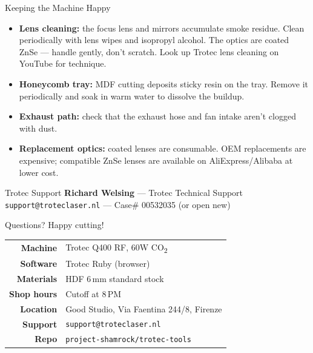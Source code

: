 \documentclass[aspectratio=169]{beamer}
\begin{document}
\begin{frame}{Keeping the Machine Happy}
\begin{itemize}
    \item \textbf{Lens cleaning:} the focus lens and mirrors accumulate smoke residue.
        Clean periodically with lens wipes and isopropyl alcohol.
        The optics are coated ZnSe --- handle gently, don't scratch.
        Look up Trotec lens cleaning on YouTube for technique.
    \item \textbf{Honeycomb tray:} MDF cutting deposits sticky resin on the tray.
        Remove it periodically and soak in warm water to dissolve the buildup.
    \item \textbf{Exhaust path:} check that the exhaust hose and fan intake
        aren't clogged with dust.
    \item \textbf{Replacement optics:} coated lenses are consumable.
        OEM replacements are expensive; compatible ZnSe lenses
        are available on AliExpress/Alibaba at lower cost.
\end{itemize}

\begin{block}{Trotec Support}
\textbf{Richard Welsing} --- Trotec Technical Support\\
\texttt{support@troteclaser.nl} --- Case\# 00532035 (or open new)
\end{block}
\end{frame}

\begin{frame}{Questions?}
\centering
\vspace{2em}
{\Large Happy cutting!}

\vspace{2em}
\begin{tabular}{rl}
\textbf{Machine} & Trotec Q400 RF, 60W CO\textsubscript{2} \\
\textbf{Software} & Trotec Ruby (browser) \\
\textbf{Materials} & HDF 6\,mm standard stock \\
\textbf{Shop hours} & Cutoff at 8\,PM \\
\textbf{Location} & Good Studio, Via Faentina 244/8, Firenze \\
\textbf{Support} & \texttt{support@troteclaser.nl} \\
\textbf{Repo} & \texttt{project-shamrock/trotec-tools} \\
\end{tabular}
\end{frame}
\end{document}
